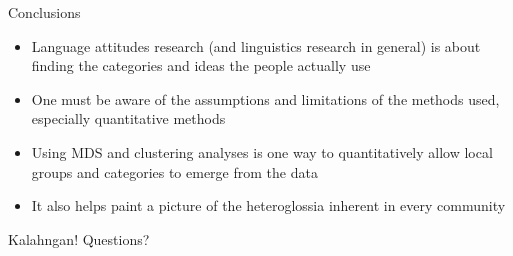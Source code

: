 \documentclass[10pt]{beamer}
\begin{document}
\begin{frame}{Conclusions}
\begin{itemize}
\item Language attitudes research (and linguistics research in general) is about finding the categories and ideas the people actually use
\item One must be aware of the assumptions and limitations of the methods used, especially quantitative methods 
\item Using MDS and clustering analyses is one way to quantitatively allow local groups and categories to emerge from the data
\item It also helps paint a picture of the heteroglossia inherent in every community
\end{itemize}
\end{frame}

\begin{frame}{Kalahngan!}
Questions?
\end{frame}





\begin{frame}
{}
\end{frame}
\end{document}
